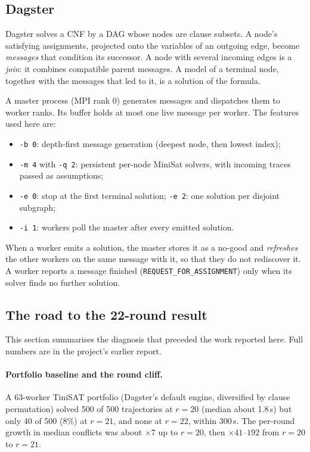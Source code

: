 \documentclass[11pt,a4paper]{article}
\newcommand{\flag}[1]{\texttt{#1}}
\begin{document}
\subsection{Dagster}

Dagster \cite{burgess2022dagster,burgess2023dagster} solves a CNF by a DAG whose nodes are clause subsets. A node's satisfying
assignments, projected onto the variables of an outgoing edge, become \emph{messages} that condition
its successor. A node with several incoming edges is a \emph{join}: it combines compatible parent
messages. A model of a terminal node, together with the messages that led to it, is a solution of
the formula.

A master process (MPI rank 0) generates messages and dispatches them to worker ranks. Its buffer
holds at most one live message per worker. The features used here are:
\begin{itemize}
\item \flag{-b 0}: depth-first message generation (deepest node, then lowest index);
\item \flag{-m 4} with \flag{-q 2}: persistent per-node MiniSat solvers, with incoming traces passed
as assumptions;
\item \flag{-e 0}: stop at the first terminal solution; \flag{-e 2}: one solution per disjoint
subgraph;
\item \flag{-i 1}: workers poll the master after every emitted solution.
\end{itemize}
When a worker emits a solution, the master stores it as a no-good and \emph{refreshes} the other
workers on the same message with it, so that they do not rediscover it. A worker reports a message
finished (\texttt{REQUEST\_FOR\_ASSIGNMENT}) only when its solver finds no further solution.

\subsection{The road to the 22-round result}\label{sec:diagnosis}

This section summarises the diagnosis that preceded the work reported here. Full numbers are in the
project's earlier report.

\paragraph{Portfolio baseline and the round cliff.} A 63-worker TiniSAT portfolio (Dagster's default
engine, diversified by clause permutation) solved 500 of 500 trajectories at $r=20$ (median about
1.8\,s) but only 40 of 500 (8\%) at $r=21$, and none at $r=22$, within 300\,s. The per-round growth
in median conflicts was about $\times7$ up to $r=20$, then $\times41$--$192$ from $r=20$ to $r=21$.
\end{document}
